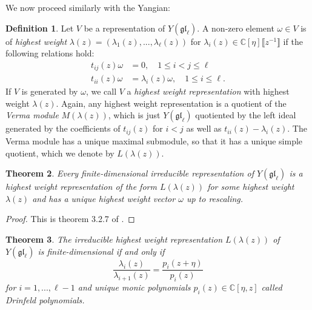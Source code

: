 \documentclass[11pt]{report}
\newtheorem{theorem}{Theorem}[section]
\theoremstyle{definition}
\newtheorem{definition}[theorem]{Definition}
\theoremstyle{remark}
\theoremstyle{remark}
\newcommand{\C}{\mathbb{C}}
\begin{document}
We now proceed similarly with the Yangian:

\begin{definition}
Let $V$ be a representation of $Y(\mathfrak{gl}_\ell)$. A non-zero element $\omega \in V$ is of \emph{highest weight} $\lambda(z) = (\lambda_1(z),...,\lambda_\ell(z))$ for $\lambda_i(z) \in \C[\eta]\llbracket z^{-1} \rrbracket$ if the following relations hold:
\begin{align*}
t_{ij}(z) \omega &= 0, \quad 1 \leq i < j \leq \ell \\
t_{ii}(z) \omega &= \lambda_i(z) \omega, \quad 1 \leq i \leq \ell.
\end{align*}
If $V$ is generated by $\omega$, we call $V$ a \emph{highest weight representation} with highest weight $\lambda(z)$. Again, any highest weight representation is a quotient of the \emph{Verma module} $M(\lambda(z))$, which is just $Y(\mathfrak{gl}_\ell)$ quotiented by the left ideal generated by the coefficients of $t_{ij}(z)$ for $i<j$ as well as $t_{ii}(z) - \lambda_i(z)$. The Verma module has a unique maximal submodule, so that it has a unique simple quotient, which we denote by $L(\lambda(z))$.
\end{definition}

\begin{theorem}
Every finite-dimensional irreducible representation of $Y(\mathfrak{gl}_\ell)$ is a highest weight representation of the form $L(\lambda(z))$ for some highest weight $\lambda(z)$ and has a unique highest weight vector $\omega$ up to rescaling.
\end{theorem}

\begin{proof}
This is theorem 3.2.7 of \cite{book:molev}.
\end{proof}

\begin{theorem}
The irreducible highest weight representation $L(\lambda(z))$ of $Y(\mathfrak{gl}_\ell)$ is finite-dimensional if and only if
\begin{equation*}
\frac{\lambda_i(z)}{\lambda_{i+1}(z)} = \frac{p_i(z+\eta)}{p_i(z)}
\end{equation*}
for $i=1,...,\ell-1$ and unique monic polynomials $p_i(z) \in \C[\eta,z]$ called \emph{Drinfeld polynomials}.
\end{theorem}
\end{document}
